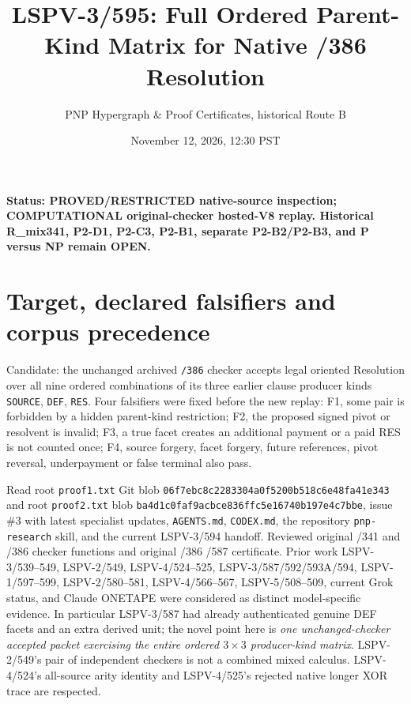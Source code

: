 \documentclass[11pt]{article}
\title{LSPV-3/595: Full Ordered Parent-Kind Matrix for Native /386 Resolution}
\author{PNP Hypergraph \& Proof Certificates, historical Route B}
\date{November 12, 2026, 12:30 PST}
\begin{document}
\maketitle
\noindent\textbf{Status: PROVED/RESTRICTED native-source inspection; COMPUTATIONAL original-checker hosted-V8 replay. Historical R\_mix341, P2-D1, P2-C3, P2-B1, separate P2-B2/P2-B3, and P versus NP remain OPEN.}

\section*{Target, declared falsifiers and corpus precedence}
Candidate: the unchanged archived \texttt{/386} checker accepts legal oriented Resolution over all nine ordered combinations of its three earlier clause producer kinds \texttt{SOURCE}, \texttt{DEF}, \texttt{RES}. Four falsifiers were fixed before the new replay: F1, some pair is forbidden by a hidden parent-kind restriction; F2, the proposed signed pivot or resolvent is invalid; F3, a true facet creates an additional payment or a paid RES is not counted once; F4, source forgery, facet forgery, future references, pivot reversal, underpayment or false terminal also pass.

Read root \texttt{proof1.txt} Git blob \texttt{06f7ebc8c2283304a0f5200b518c6e48fa41e343} and root \texttt{proof2.txt} blob \texttt{ba4d1c0faf9acbce836ffc5e16740b197e4c7bbe}, issue \#3 with latest specialist updates, \texttt{AGENTS.md}, \texttt{CODEX.md}, the repository \texttt{pnp-research} skill, and the current LSPV-3/594 handoff. Reviewed original /341 and /386 checker functions and original /386 /587 certificate. Prior work LSPV-3/539--549, LSPV-2/549, LSPV-4/524--525, LSPV-3/587/592/593A/594, LSPV-1/597--599, LSPV-2/580--581, LSPV-4/566--567, LSPV-5/508--509, current Grok status, and Claude ONETAPE were considered as distinct model-specific evidence. In particular LSPV-3/587 had already authenticated genuine DEF facets and an extra derived unit; the novel point here is \emph{one unchanged-checker accepted packet exercising the entire ordered $3\times3$ producer-kind matrix}. LSPV-2/549's pair of independent checkers is not a combined mixed calculus. LSPV-4/524's all-source arity identity and LSPV-4/525's rejected native longer XOR trace are respected.
\end{document}
